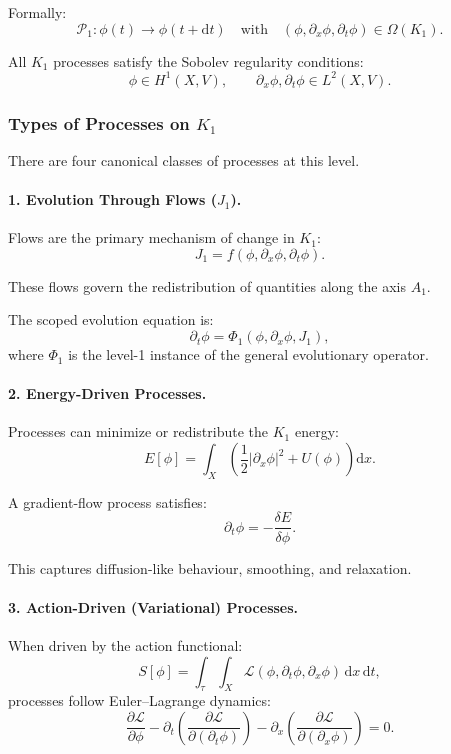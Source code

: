 Formally:
\[
\mathcal{P}_1: \phi(t) \longrightarrow \phi(t+\mathrm{d}t)
\quad \text{with} \quad
(\phi, \partial_x \phi, \partial_t \phi) \in \Omega(K_1).
\]

All $K_1$ processes satisfy the Sobolev regularity conditions:
\[
\phi \in H^1(X,V),
\qquad
\partial_x \phi, \partial_t \phi \in L^2(X,V).
\]

\subsubsection{Types of Processes on \texorpdfstring{$K_1$}{K_1}}

There are four canonical classes of processes at this level.

\paragraph{1. Evolution Through Flows (\texorpdfstring{$J_1$}{J_1}).}

Flows are the primary mechanism of change in $K_1$:
\[
J_1 = f(\phi, \partial_x\phi, \partial_t\phi).
\]

These flows govern the redistribution of quantities along the axis $A_1$.

The scoped evolution equation is:
\[
\partial_t \phi = \Phi_1(\phi, \partial_x \phi, J_1),
\]
where $\Phi_1$ is the level-1 instance of the general evolutionary operator.

\paragraph{2. Energy-Driven Processes.}

Processes can minimize or redistribute the $K_1$ energy:
\[
E[\phi] = \int_X \left(
\frac{1}{2} |\partial_x \phi|^2 + U(\phi)
\right) \mathrm{d}x.
\]

A gradient-flow process satisfies:
\[
\partial_t \phi = - \frac{\delta E}{\delta \phi}.
\]

This captures diffusion-like behaviour, smoothing, and relaxation.

\paragraph{3. Action-Driven (Variational) Processes.}

When driven by the action functional:
\[
S[\phi] = \int_{\tau} \int_X
\mathcal{L}(\phi, \partial_t\phi, \partial_x\phi) \, \mathrm{d}x \, \mathrm{d}t,
\]
processes follow Euler–Lagrange dynamics:
\[
\frac{\partial \mathcal{L}}{\partial \phi}
- \partial_t \left( \frac{\partial \mathcal{L}}{\partial(\partial_t \phi)} \right)
- \partial_x \left( \frac{\partial \mathcal{L}}{\partial(\partial_x \phi)} \right)
= 0.
\]

